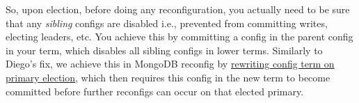 \documentclass[
]{article}
\begin{document}
So, upon election, before doing any reconfiguration, you actually need to be sure that any \textit{sibling} configs are disabled i.e., prevented from committing writes, electing leaders, etc. You achieve this by committing a config in the parent config in your term, which disables all sibling configs in lower terms. Similarly to Diego's fix, we achieve this in MongoDB reconfig by \href{https://github.com/will62794/logless-reconfig/blob/5b1d0f3bfd93c4d78470689a56959d1dcc5297a2/MongoLoglessDynamicRaft.tla#L90-L91}{rewriting config term on primary election}, which then requires this config in the new term to become committed before further reconfigs can occur on that elected primary.
\end{document}
